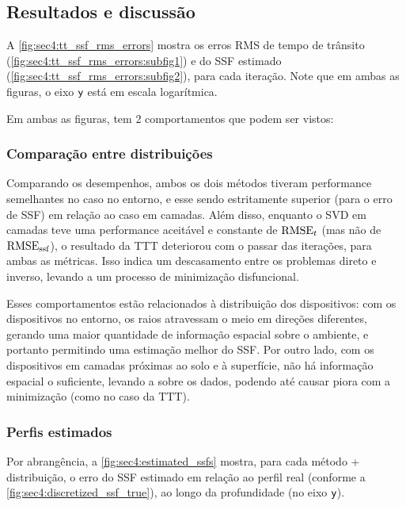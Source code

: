 

\subsection{Resultados e discussão}
\label{subsec:sec3:resultados_e_discussao}

A \cref{fig:sec4:tt_ssf_rms_errors} mostra os erros RMS de tempo de trânsito (\cref{fig:sec4:tt_ssf_rms_errors:subfig1}) e do SSF estimado (\cref{fig:sec4:tt_ssf_rms_errors:subfig2}), para cada iteração. Note que em ambas as figuras, o eixo ${\textsf{y}}$ está em escala logarítmica.

Em ambas as figuras, tem 2 comportamentos que podem ser vistos:

\subsubsection*{Comparação entre distribuições}

Comparando os desempenhos, ambos os dois métodos tiveram performance semelhantes no caso no entorno, e esse sendo estritamente superior (para o erro de SSF) em relação ao caso em camadas. Além disso, enquanto o SVD em camadas teve uma performance aceitável e constante de $\operatorname{RMSE}_{t}$ (mas não de $\operatorname{RMSE}_{\operatorname{ssf}}$), o resultado da TTT deteriorou com o passar das iterações, para ambas as métricas. Isso indica um descasamento entre os problemas direto e inverso, levando a um processo de minimização disfuncional.

Esses comportamentos estão relacionados à distribuição dos dispositivos: com os dispositivos no entorno, os raios atravessam o meio em direções diferentes, gerando uma maior quantidade de informação espacial sobre o ambiente, e portanto permitindo uma estimação melhor do SSF. Por outro lado, com os dispositivos em camadas próximas ao solo e à superfície, não há informação espacial o suficiente, levando a  sobre os dados, podendo até causar piora com a minimização (como no caso da TTT).

\subsubsection*{Perfis estimados}



Por abrangência, a \cref{fig:sec4:estimated_ssfs} mostra, para cada método + distribuição, o erro do SSF estimado em relação ao perfil real (conforme a \cref{fig:sec4:discretized_ssf_true}), ao longo da profundidade (no eixo ${\textsf{y}}$).

